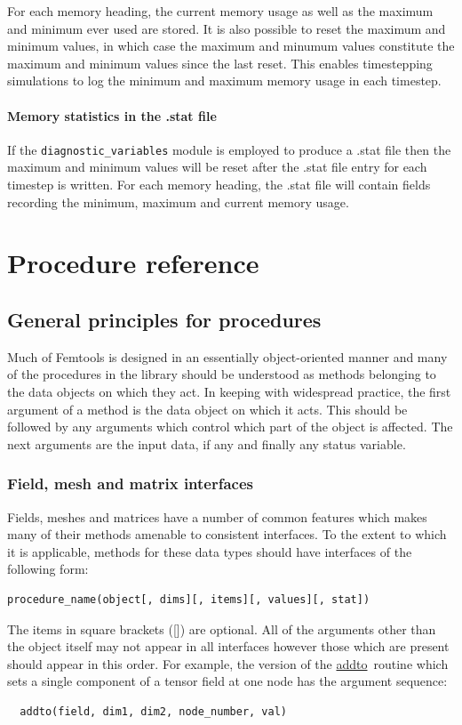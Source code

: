\documentclass[a4paper, 11pt]{book}
\begin{document}
For each memory heading, the current memory usage as well as the maximum and
minimum ever used are stored. It is also possible to reset the maximum and
minimum values, in which case the maximum and minumum values constitute the
maximum and minimum values since the last reset. This enables timestepping
simulations to log the minimum and maximum memory usage in each timestep. 

\subsection{Memory statistics in the .stat file}

If the \lstinline+diagnostic_variables+ module is employed to produce a
.stat file then the maximum and minimum values will be reset
after the .stat file entry for each timestep is written. For each memory
heading, the .stat file will contain fields recording the minimum, maximum
and current memory usage.

\part{Procedure reference}


\chapter{General principles for procedures}

Much of Femtools is designed in an essentially object-oriented manner and
many of the procedures in the library should be understood as methods
belonging to the data objects on which they act. In keeping with widespread
practice, the first argument of a method is the data object on which it
acts. This should be followed by any arguments which control which part of
the object is affected. The next arguments are the input data, if any and
finally any status variable.

\section{Field, mesh and matrix interfaces}

Fields, meshes and matrices have a number of common features which makes
many of their methods amenable to consistent interfaces. To the extent to
which it is applicable, methods for these data types should have interfaces
of the following form:
\begin{lstlisting}[language=bnf]
  procedure_name(object[, dims][, items][, values][, stat])
\end{lstlisting}
The items in square brackets ([]) are optional. All of the arguments other
than the object itself may not appear in all interfaces however those which
are present should appear in this order. For example, the version of the
\hyperlink{proc:fieldaddto}{addto}\ routine which sets a single component of
a tensor field at one node has the argument sequence:
\begin{lstlisting}
  addto(field, dim1, dim2, node_number, val)
\end{lstlisting}
\end{document}
